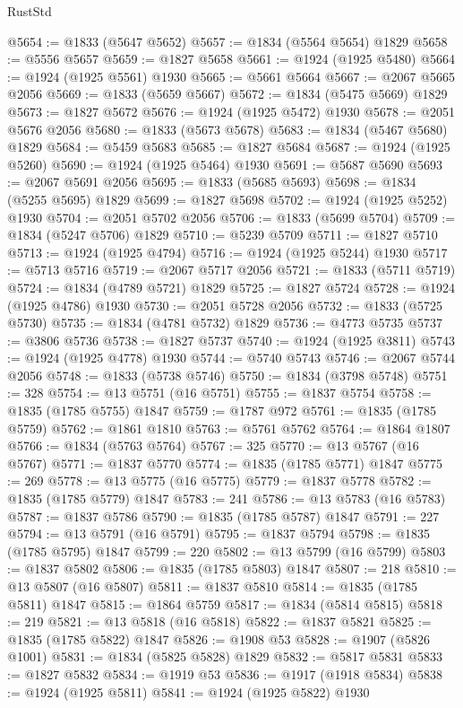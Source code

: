 \begin{lexlean}{RustStd}
\begin{coremodule}
@5654 := @1833 (@5647 @5652)
@5657 := @1834 (@5564 @5654) @1829
@5658 := @5556 @5657
@5659 := @1827 @5658
@5661 := @1924 (@1925 @5480)
@5664 := @1924 (@1925 @5561) @1930
@5665 := @5661 @5664
@5667 := @2067 @5665 @2056
@5669 := @1833 (@5659 @5667)
@5672 := @1834 (@5475 @5669) @1829
@5673 := @1827 @5672
@5676 := @1924 (@1925 @5472) @1930
@5678 := @2051 @5676 @2056
@5680 := @1833 (@5673 @5678)
@5683 := @1834 (@5467 @5680) @1829
@5684 := @5459 @5683
@5685 := @1827 @5684
@5687 := @1924 (@1925 @5260)
@5690 := @1924 (@1925 @5464) @1930
@5691 := @5687 @5690
@5693 := @2067 @5691 @2056
@5695 := @1833 (@5685 @5693)
@5698 := @1834 (@5255 @5695) @1829
@5699 := @1827 @5698
@5702 := @1924 (@1925 @5252) @1930
@5704 := @2051 @5702 @2056
@5706 := @1833 (@5699 @5704)
@5709 := @1834 (@5247 @5706) @1829
@5710 := @5239 @5709
@5711 := @1827 @5710
@5713 := @1924 (@1925 @4794)
@5716 := @1924 (@1925 @5244) @1930
@5717 := @5713 @5716
@5719 := @2067 @5717 @2056
@5721 := @1833 (@5711 @5719)
@5724 := @1834 (@4789 @5721) @1829
@5725 := @1827 @5724
@5728 := @1924 (@1925 @4786) @1930
@5730 := @2051 @5728 @2056
@5732 := @1833 (@5725 @5730)
@5735 := @1834 (@4781 @5732) @1829
@5736 := @4773 @5735
@5737 := @3806 @5736
@5738 := @1827 @5737
@5740 := @1924 (@1925 @3811)
@5743 := @1924 (@1925 @4778) @1930
@5744 := @5740 @5743
@5746 := @2067 @5744 @2056
@5748 := @1833 (@5738 @5746)
@5750 := @1834 (@3798 @5748)
@5751 := 328
@5754 := @13 @5751 (@16 @5751)
@5755 := @1837 @5754
@5758 := @1835 (@1785 @5755) @1847
@5759 := @1787 @972
@5761 := @1835 (@1785 @5759)
@5762 := @1861 @1810
@5763 := @5761 @5762
@5764 := @1864 @1807
@5766 := @1834 (@5763 @5764)
@5767 := 325
@5770 := @13 @5767 (@16 @5767)
@5771 := @1837 @5770
@5774 := @1835 (@1785 @5771) @1847
@5775 := 269
@5778 := @13 @5775 (@16 @5775)
@5779 := @1837 @5778
@5782 := @1835 (@1785 @5779) @1847
@5783 := 241
@5786 := @13 @5783 (@16 @5783)
@5787 := @1837 @5786
@5790 := @1835 (@1785 @5787) @1847
@5791 := 227
@5794 := @13 @5791 (@16 @5791)
@5795 := @1837 @5794
@5798 := @1835 (@1785 @5795) @1847
@5799 := 220
@5802 := @13 @5799 (@16 @5799)
@5803 := @1837 @5802
@5806 := @1835 (@1785 @5803) @1847
@5807 := 218
@5810 := @13 @5807 (@16 @5807)
@5811 := @1837 @5810
@5814 := @1835 (@1785 @5811) @1847
@5815 := @1864 @5759
@5817 := @1834 (@5814 @5815)
@5818 := 219
@5821 := @13 @5818 (@16 @5818)
@5822 := @1837 @5821
@5825 := @1835 (@1785 @5822) @1847
@5826 := @1908 @53
@5828 := @1907 (@5826 @1001)
@5831 := @1834 (@5825 @5828) @1829
@5832 := @5817 @5831
@5833 := @1827 @5832
@5834 := @1919 @53
@5836 := @1917 (@1918 @5834)
@5838 := @1924 (@1925 @5811)
@5841 := @1924 (@1925 @5822) @1930

\end{coremodule}
\end{lexlean}
